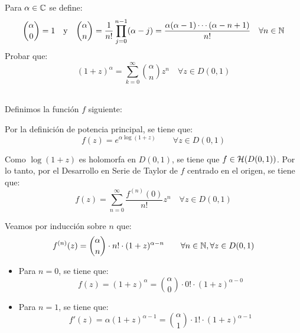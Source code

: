 \begin{ejercicio}\label{ej:8.2}
    Para $\alpha \in \mathbb{C}$ se define:
    \begin{equation*}
        \binom{\alpha}{0} = 1 \quad \text{y} \quad \binom{\alpha}{n} = \frac{1}{n!} \prod_{j=0}^{n-1} (\alpha-j) = \frac{\alpha(\alpha-1)\cdots(\alpha-n+1)}{n!} \quad \forall n \in \mathbb{N}
    \end{equation*}
    Probar que:
    \begin{equation*}
        (1+z)^{\alpha} = \sum_{k=0}^{\infty} \binom{\alpha}{n} z^n \quad \forall z \in D(0,1)
    \end{equation*}~

    Definimos la función $f$ siguiente:

    Por la definición de potencia principal, se tiene que:
    \begin{equation*}
        f(z) = e^{\alpha \log(1+z)}\qquad \forall z \in D(0,1)
    \end{equation*}

    Como $\log(1+z)$ es holomorfa en $D(0,1)$, se tiene que $f\in \mathcal{H}(D(0,1))$. Por lo tanto, por el Desarrollo en Serie de Taylor de $f$ centrado en el origen, se tiene que:
    \begin{equation*}
        f(z) = \sum_{n=0}^{\infty} \frac{f^{(n)}(0)}{n!} z^n \quad \forall z \in D(0,1)
    \end{equation*}

    Veamos por inducción sobre $n$ que:
    \begin{equation*}
        f^{(n)}(z) = \binom{\alpha}{n}\cdot n!\cdot (1+z)^{\alpha-n} \qquad \forall n \in \mathbb{N}, \forall z \in D(0,1)
    \end{equation*}
    \begin{itemize}
        \item Para $n=0$, se tiene que:
        \begin{equation*}
            f(z) = (1+z)^{\alpha} = \binom{\alpha}{0}\cdot 0!\cdot (1+z)^{\alpha-0}
        \end{equation*}

        \item Para $n=1$, se tiene que:
        \begin{equation*}
            f'(z) = \alpha(1+z)^{\alpha-1} = \binom{\alpha}{1}\cdot 1!\cdot (1+z)^{\alpha-1}
        \end{equation*}


\end{itemize}
\end{ejercicio}
